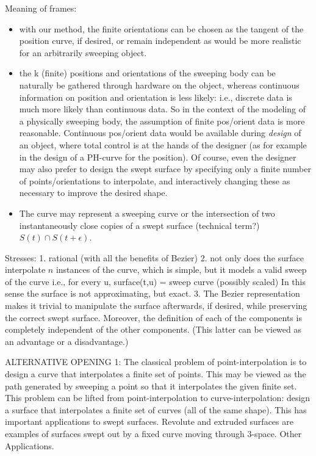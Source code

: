 Meaning of frames:
\begin{itemize}
\item
	with our method, the finite orientations can be chosen as
	the tangent of the position curve, if desired, or remain independent
	as would be more realistic for an arbitrarily sweeping object.
\item
	the k (finite) positions and orientations of the sweeping body
	can be naturally be gathered through hardware on the object,
	whereas continuous information on position and orientation
	is less likely: i.e., discrete data is much more likely
	than continuous data.  So in the context of the modeling of a
	physically sweeping body, the assumption of finite pos/orient data
	is more reasonable.  Continuous pos/orient data would be
	available during {\em design} of an object, where total control
	is at the hands of the designer (as for example in the design
	of a PH-curve for the position).  Of course, even the designer may
	also prefer to design the swept surface by specifying only
	a finite number of points/orientations to interpolate,
	and interactively changing these as necessary to improve the
	desired shape.
\item 
	The curve may represent a sweeping curve or the intersection of
 	two instantaneously close copies of a swept surface (technical term?)
	$S(t) \cap S(t + \epsilon)$.
\end{itemize}


Stresses:
1. rational (with all the benefits of Bezier)
2. not only does the surface interpolate $n$ instances of the curve,
   which is simple, but it models a valid sweep of the curve
   i.e., for every u, surface(t,u) = sweep curve (possibly scaled)
   In this sense the surface is not approximating, but exact.
3. The Bezier representation makes it trivial to 
	manipulate the surface afterwards, if desired,
	while preserving the correct swept surface.
	Moreover, the definition of each of the components is completely
	independent of the other components.
	(This latter can be viewed as an advantage or a disadvantage.)

ALTERNATIVE OPENING 1:
The classical problem of point-interpolation is to design a curve
that interpolates a finite set of points.
This may be viewed as the path generated by sweeping a point so that
it interpolates the given finite set.
This problem can be lifted from point-interpolation to
curve-interpolation: design a surface that interpolates a finite set of curves
(all of the same shape).
This has important applications to swept surfaces.
Revolute and extruded surfaces are examples of surfaces swept out
by a fixed curve moving through 3-space.
Other Applications.

